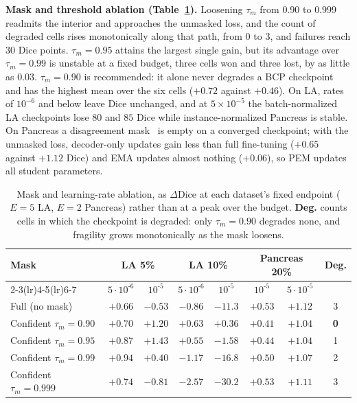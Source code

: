 \documentclass[conference]{IEEEtran}
\begin{document}
\noindent\textbf{Mask and threshold ablation (Table~\ref{tab:ablation}).}
Loosening $\tau_m$ from $0.90$ to $0.999$ readmits the interior and approaches the unmasked loss, and the count of degraded cells rises monotonically along that path, from $0$ to $3$, and failures reach $30$ Dice points. $\tau_m=0.95$ attains the largest single gain, but its advantage over $\tau_m=0.99$ is unstable at a fixed budget, three cells won and three lost, by as little as $0.03$. $\tau_m=0.90$ is recommended: it alone never degrades a BCP checkpoint and has the highest mean over the six cells ($+0.72$ against $+0.46$). On LA, rates of $10^{-6}$ and below leave Dice unchanged, and at $5\times10^{-5}$ the batch-normalized LA checkpoints lose $80$ and $85$ Dice while instance-normalized Pancreas is stable. On Pancreas a disagreement mask~\cite{yu2019uamt} is empty on a converged checkpoint; with the unmasked loss, decoder-only updates gain less than full fine-tuning ($+0.65$ against $+1.12$ Dice) and EMA updates almost nothing ($+0.06$), so PEM updates all student parameters.

\begin{table}[tb]
\centering
\caption{Mask and learning-rate ablation, as $\Delta$Dice at each dataset's fixed endpoint ($E{=}5$ LA, $E{=}2$ Pancreas) rather than at a peak over the budget. \textbf{Deg.} counts cells in which the checkpoint is degraded: only $\tau_m{=}0.90$ degrades none, and fragility grows monotonically as the mask loosens.}
\label{tab:ablation}
\scriptsize
\renewcommand{\arraystretch}{0.92}
\setlength{\tabcolsep}{2.2pt}
\begin{tabular}{lccccccc}
\toprule
\multirow{2}{*}{\textbf{Mask}} & \multicolumn{2}{c}{\textbf{LA 5\%}} & \multicolumn{2}{c}{\textbf{LA 10\%}} & \multicolumn{2}{c}{\textbf{Pancreas 20\%}} & \multirow{2}{*}{\textbf{Deg.}} \\
\cmidrule(lr){2-3}\cmidrule(lr){4-5}\cmidrule(lr){6-7}
 & $5{\cdot}10^{\text{-}6}$ & $10^{\text{-}5}$ & $5{\cdot}10^{\text{-}6}$ & $10^{\text{-}5}$ & $10^{\text{-}5}$ & $5{\cdot}10^{\text{-}5}$ & \\
\midrule
Full (no mask)                &   $+0.66$ &   $-0.53$ &   $-0.86$ &   $-11.3$ &   $+0.53$ &   $+1.12$ & 3 \\
Confident $\tau_m{=}0.90$     &   $+0.70$ &   $+1.20$ &   $+0.63$ &   $+0.36$ &   $+0.41$ &   $+1.04$ & \textbf{0} \\
Confident $\tau_m{=}0.95$     &   $+0.87$ &   $+1.43$ &   $+0.55$ &   $-1.58$ &   $+0.44$ &   $+1.04$ & 1 \\
Confident $\tau_m{=}0.99$     &   $+0.94$ &   $+0.40$ &   $-1.17$ &   $-16.8$ &   $+0.50$ &   $+1.07$ & 2 \\
Confident $\tau_m{=}0.999$    &   $+0.74$ &   $-0.81$ &   $-2.57$ &   $-30.2$ &   $+0.53$ &   $+1.11$ & 3 \\
\bottomrule
\end{tabular}
\end{table}
\end{document}

